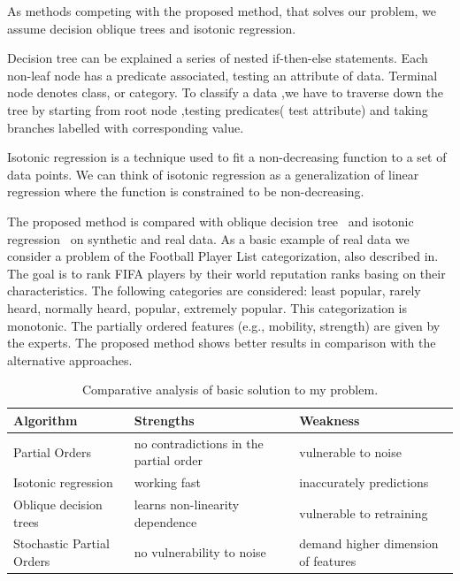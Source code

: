 \documentclass[12pt,preprint]{elsarticle}
\begin{document}
As methods competing with the proposed method, that solves our problem, we assume decision oblique trees and isotonic regression.

Decision tree can be explained a series of nested if-then-else statements. Each  non-leaf  node  has  a  predicate  associated, testing an  attribute of data.  Terminal node  denotes class, or category. To classify a data ,we have to traverse down the tree by starting  from root  node ,testing predicates( test attribute) and taking branches labelled with corresponding value.

Isotonic regression is a technique used to fit a non-decreasing function to a set of data points.
We can think of isotonic regression as a generalization of linear regression where the function is constrained to be non-decreasing.

The proposed method is compared with oblique decision tree~\cite{Wilhelm2021} and isotonic regression~\cite{SALMON2017} on synthetic and real data. As a basic example of real data we consider a problem of the Football Player List categorization, also described in. The goal is to rank FIFA players by their world reputation ranks basing on their characteristics. The following categories are considered: least popular, rarely heard, normally heard, popular, extremely popular. This categorization is monotonic. The partially ordered features (e.g., mobility, strength) are given by the experts. The proposed method shows better results in comparison with the alternative approaches.

\begin{table}[!htbp]
\label{tab:intro_comparative}
\caption{Comparative analysis of basic solution to my problem.}
\begin{tabular}{|p{5cm}|p{5cm}p{5cm}|} \hline
	Algorithm & Strengths & Weakness \\
	\hline
	Partial Orders & 
	no contradictions in the partial order &
	vulnerable to noise \\
    \hline
	Isotonic regression~\cite{SALMON2017} & 
	working fast &
	inaccurately predictions \\
    \hline
	Oblique decision trees~\cite{Wilhelm2021} & 
	learns non-linearity dependence &
	vulnerable to retraining \\
    \hline
	Stochastic Partial Orders & 
	no vulnerability to noise &
	demand higher dimension of features \\
    \hline
\end{tabular} 
\end{table}
\end{document}
